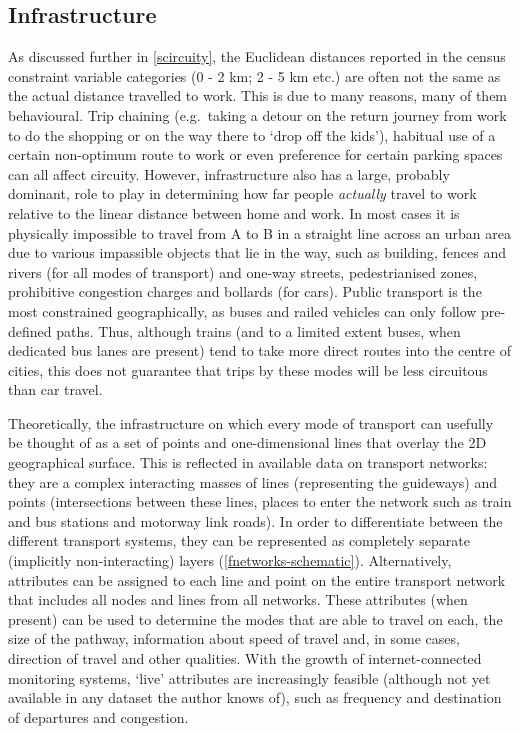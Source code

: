 \documentclass[a4paper, 11pt, twoside]{Thesis}
\begin{document}
\subsection{Infrastructure}
As discussed further in \cref{scircuity}, the Euclidean distances reported in
the census constraint variable categories (0 - 2 km; 2 - 5 km etc.) are often
not the same as the actual distance travelled to work. This is due to many
reasons, many of them behavioural.
Trip chaining (e.g.~taking a detour on the return journey from
work to do the shopping or on the way there to `drop off the kids'), habitual
use of a certain non-optimum route to work or even preference for
certain parking spaces can all affect circuity. However, infrastructure also
has a large, probably dominant, role to play in determining
how far people \emph{actually} travel to
work relative to the linear distance between home and work. In most cases it is
physically
impossible to travel from A to B in a straight line across an urban area due to
various impassible objects that lie in the way, such as building, fences and
rivers (for all modes of transport) and one-way streets, pedestrianised zones,
prohibitive congestion charges and bollards (for cars). Public transport is the
most constrained geographically, as buses and railed vehicles can only follow
pre-defined paths. Thus, although trains (and to a limited extent buses, when
dedicated bus lanes are present) tend to take more direct routes into the
centre of cities, this does not guarantee that trips by these modes will be
less circuitous than car travel.

Theoretically, the infrastructure on which every mode of transport can usefully
be thought of as a set of points and one-dimensional lines that overlay the
2D geographical surface. 
This is reflected in available data on transport
networks: they are
a complex interacting masses of lines (representing the guideways) and points
(intersections between these lines, places to enter the network such as
train and bus stations and motorway link roads). In order to differentiate
between the different transport systems, they can be represented as
completely separate (implicitly non-interacting) layers
(\cref{fnetworks-schematic}). Alternatively,
attributes can be assigned to each
line and point on the entire transport network that includes all nodes and
lines from all networks. These attributes (when present) can be used to
determine the modes that
are able to travel on each, the size of the pathway, information about speed
of travel and, in some cases, direction of travel and other qualities.
With the growth of internet-connected monitoring systems, 
`live' attributes are increasingly feasible (although not yet available in any
dataset the author knows of), such as frequency and destination of departures
and congestion.
\end{document}
